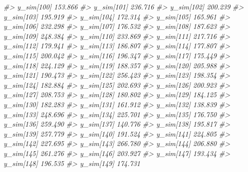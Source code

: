 \documentclass[
  10pt,
  italian,
  a4paper,
  extrafontsizes,onecolumn,openright
  ]{memoir}
\newenvironment{Shaded}{\begin{snugshade}}{\end{snugshade}}
\newcommand{\CommentTok}[1]{\textcolor[rgb]{0.56,0.35,0.01}{\textit{#1}}}
\begin{document}
\begin{Shaded}
\begin{Highlighting}[]
\CommentTok{\#\textgreater{}   y\_sim[100] 153.866}
\CommentTok{\#\textgreater{}   y\_sim[101] 236.716}
\CommentTok{\#\textgreater{}   y\_sim[102] 200.239}
\CommentTok{\#\textgreater{}   y\_sim[103] 195.919}
\CommentTok{\#\textgreater{}   y\_sim[104] 172.314}
\CommentTok{\#\textgreater{}   y\_sim[105] 165.961}
\CommentTok{\#\textgreater{}   y\_sim[106] 232.298}
\CommentTok{\#\textgreater{}   y\_sim[107] 176.532}
\CommentTok{\#\textgreater{}   y\_sim[108] 187.623}
\CommentTok{\#\textgreater{}   y\_sim[109] 248.384}
\CommentTok{\#\textgreater{}   y\_sim[110] 233.869}
\CommentTok{\#\textgreater{}   y\_sim[111] 217.716}
\CommentTok{\#\textgreater{}   y\_sim[112] 179.941}
\CommentTok{\#\textgreater{}   y\_sim[113] 186.807}
\CommentTok{\#\textgreater{}   y\_sim[114] 177.807}
\CommentTok{\#\textgreater{}   y\_sim[115] 200.042}
\CommentTok{\#\textgreater{}   y\_sim[116] 196.347}
\CommentTok{\#\textgreater{}   y\_sim[117] 175.449}
\CommentTok{\#\textgreater{}   y\_sim[118] 224.129}
\CommentTok{\#\textgreater{}   y\_sim[119] 188.357}
\CommentTok{\#\textgreater{}   y\_sim[120] 205.988}
\CommentTok{\#\textgreater{}   y\_sim[121] 190.473}
\CommentTok{\#\textgreater{}   y\_sim[122] 256.423}
\CommentTok{\#\textgreater{}   y\_sim[123] 198.354}
\CommentTok{\#\textgreater{}   y\_sim[124] 182.884}
\CommentTok{\#\textgreater{}   y\_sim[125] 202.693}
\CommentTok{\#\textgreater{}   y\_sim[126] 200.923}
\CommentTok{\#\textgreater{}   y\_sim[127] 208.753}
\CommentTok{\#\textgreater{}   y\_sim[128] 180.802}
\CommentTok{\#\textgreater{}   y\_sim[129] 184.125}
\CommentTok{\#\textgreater{}   y\_sim[130] 182.283}
\CommentTok{\#\textgreater{}   y\_sim[131] 161.912}
\CommentTok{\#\textgreater{}   y\_sim[132] 138.839}
\CommentTok{\#\textgreater{}   y\_sim[133] 248.696}
\CommentTok{\#\textgreater{}   y\_sim[134] 225.701}
\CommentTok{\#\textgreater{}   y\_sim[135] 176.750}
\CommentTok{\#\textgreater{}   y\_sim[136] 259.490}
\CommentTok{\#\textgreater{}   y\_sim[137] 140.776}
\CommentTok{\#\textgreater{}   y\_sim[138] 195.817}
\CommentTok{\#\textgreater{}   y\_sim[139] 257.779}
\CommentTok{\#\textgreater{}   y\_sim[140] 191.524}
\CommentTok{\#\textgreater{}   y\_sim[141] 224.805}
\CommentTok{\#\textgreater{}   y\_sim[142] 227.695}
\CommentTok{\#\textgreater{}   y\_sim[143] 266.780}
\CommentTok{\#\textgreater{}   y\_sim[144] 206.880}
\CommentTok{\#\textgreater{}   y\_sim[145] 261.276}
\CommentTok{\#\textgreater{}   y\_sim[146] 203.927}
\CommentTok{\#\textgreater{}   y\_sim[147] 193.434}
\CommentTok{\#\textgreater{}   y\_sim[148] 196.535}
\CommentTok{\#\textgreater{}   y\_sim[149] 174.731}

\end{Highlighting}
\end{Shaded}
\end{document}
